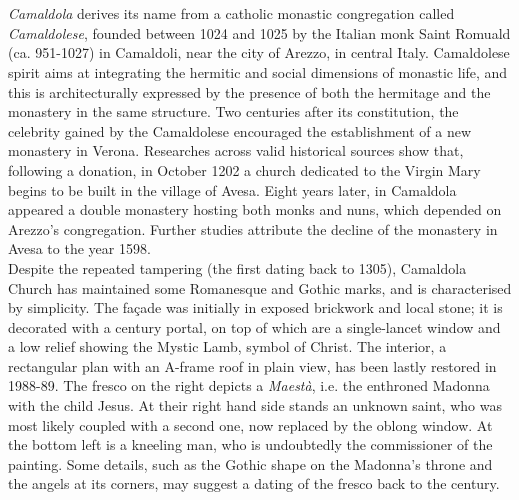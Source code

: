 \documentclass[10pt,b6paper,usenames,twoside]{article}
\begin{document}
\section*{\textcolor{forestgreen(traditional)}{}} 
\textit{Camaldola} derives its name from a catholic monastic congregation called \textit{Camaldolese}, founded between 1024 and 1025 by the Italian monk Saint Romuald (ca. 951-1027) in Camaldoli, near the city of Arezzo, in central Italy. Camaldolese spirit aims at integrating the hermitic and social dimensions of monastic life, and this is architecturally expressed by the presence of both the hermitage and the monastery in the same structure. Two centuries after its constitution, the celebrity gained by the Camaldolese encouraged the establishment of a new monastery in Verona. Researches across valid historical sources show that, following a donation, in October 1202 a church dedicated to the Virgin Mary begins to be built in the village of Avesa. Eight years later, in Camaldola appeared a double monastery hosting both monks and nuns, which depended on Arezzo’s congregation. Further studies attribute the decline of the monastery in Avesa to the year 1598.\\

Despite the repeated tampering (the first dating back to 1305), Camaldola Church has maintained some Romanesque and Gothic marks, and is characterised by simplicity. The façade was initially in exposed brickwork and local stone; it is decorated with a  century portal, on top of which are a single-lancet window and a low relief showing the Mystic Lamb, symbol of Christ. The interior, a rectangular plan with an A-frame roof in plain view, has been lastly restored in 1988-89. The fresco on the right depicts a \textit{Maestà}, i.e. the enthroned Madonna with the child Jesus. At their right hand side stands an unknown saint, who was most likely coupled with a second one, now replaced by the oblong window. At the bottom left is a kneeling man, who is undoubtedly the commissioner of the painting. Some details, such as the Gothic shape on the Madonna’s throne and the angels at its corners, may suggest a dating of the fresco back to the  century.\\ 
\end{document}
